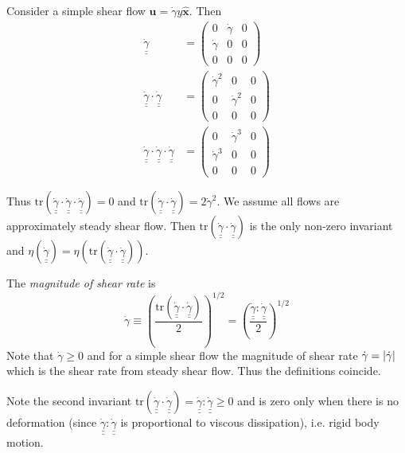 \documentclass{jknotes}
\newcommand{\dunder}[1]{\underline{\underline{#1}}}
\renewcommand{\trace}[1]{\text{tr}\left(#1\right)}
\newcommand{\srate}{\dot{\gamma}}
\begin{document}
Consider a simple shear flow $\bm{u} = \dot{\gamma} y \hat{\bm{x}}$. Then
\begin{equation}
	\begin{aligned}
		\dunder{\srate} &= \begin{pmatrix} 0 & \srate & 0 \\ \srate & 0 & 0 \\
		0 & 0 & 0 \end{pmatrix} \\
			\dunder{\srate}\cdot\dunder{\srate} &= \begin{pmatrix} \srate^2 &
			0 & 0 \\ 0 & \srate^2 & 0 \\ 0 & 0 & 0 \end{pmatrix} \\
			\dunder{\srate}\cdot\dunder{\srate}\cdot\dunder{\srate} &=
			\begin{pmatrix} 0 & \srate^3 & 0 \\ \srate^3 & 0 & 0 \\
			0 & 0 & 0 \end{pmatrix}
		\end{aligned}
\end{equation}

Thus $\trace{\dunder{\srate}\cdot\dunder{\srate}\cdot\dunder{\srate}} = 0$ and
$\trace{\dunder{\srate}\cdot\dunder{\srate}} = 2\srate^2$. We assume all flows
are approximately steady shear flow. Then
$\trace{\dunder{\srate}\cdot\dunder{\srate}}$ is the only non-zero invariant
and $\eta(\dunder{\srate}) =
\eta(\trace{\dunder{\srate}\cdot\dunder{\srate}})$.

\begin{defn}
	The \emph{magnitude of shear rate} is
	\begin{equation}
		\srate \equiv
		\left(\frac{\trace{\dunder{\srate}\cdot\dunder{\srate}}}{2}\right)^{1/2}
		= \left(\frac{\dunder{\srate} : \dunder{\srate}}{2}\right)^{1/2}
	\end{equation}
	Note that $\srate \ge 0$ and for a simple shear flow the magnitude of
	shear rate $\srate = \abs{\srate}$ which is the shear rate from steady
	shear flow. Thus the definitions coincide.
\end{defn}

Note the second invariant $\trace{\dunder{\srate}\cdot\dunder{\srate}} =
\dunder{\srate}:\dunder{\srate} \ge 0$ and is zero only when there is no
deformation (since $\dunder{\srate}:\dunder{\srate}$ is proportional to
viscous dissipation), i.e. rigid body motion.
\end{document}
